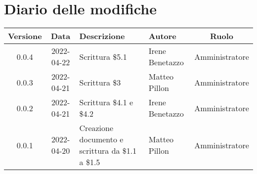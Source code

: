 \section*{Diario delle modifiche}
	\begin{center}
	\renewcommand{\arraystretch}{1.8} %
	\begin{tabular}{ |c|c|m{12em}|m{7em}|c| }
	\hline
	\textbf{Versione} & \textbf{Data} & \textbf{Descrizione} &  \textbf{Autore} &  \textbf{Ruolo} \\ %
	\hline
	0.0.4 & 2022-04-22 & Scrittura \$5.1 & Irene Benetazzo & Amministratore\\
	\hline 
	0.0.3 & 2022-04-21 & Scrittura \$3 & Matteo Pillon & Amministratore\\
	\hline
	0.0.2 & 2022-04-21 & Scrittura \$4.1 e \$4.2 & Irene Benetazzo & Amministratore\\
	\hline
    0.0.1 & 2022-04-20 & Creazione documento e scrittura da \$1.1 a \$1.5 & Matteo Pillon & Amministratore\\ %
	\hline
	\end{tabular}
	\end{center}
	\newpage